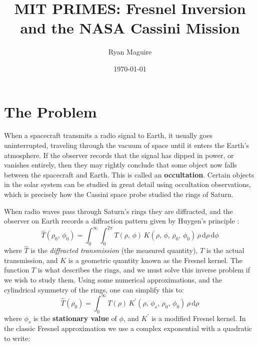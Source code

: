 \documentclass{article}
\title{MIT PRIMES: Fresnel Inversion and the NASA Cassini Mission}
\author{Ryan Maguire}
\date{\today}
\begin{document}
    \maketitle
    \section{The Problem}
        When a spacecraft transmits a radio signal to Earth, it usually goes
        uninterrupted, traveling through the vacuum of space until it enters
        the Earth's atmosphere. If the observer records that the signal has
        dipped in power, or vanishes entirely, then they may rightly conclude
        that some object now falls between the spacecraft and Earth. This is
        called an \textbf{occultation}. Certain objects in the solar system
        can be studied in great detail using occultation observations, which is
        precisely how the Cassini space probe studied the rings of Saturn.
        \par\hfill\par
        When radio waves pass through Saturn's rings they are diffracted, and
        the observer on Earth records a diffraction pattern given by
        Huygen's principle \cite{Goodman1969IntroductionTF}:
        \begin{equation}
            \hat{T}(\rho_{0},\,\phi_{0})
            =\int_{0}^{\infty}\int_{0}^{2\pi}
                T(\rho,\,\phi)\,
                K(\rho,\,\phi,\,\rho_{0},\,\phi_{0})\,
                \rho\,\textrm{d}\rho\,\textrm{d}\phi
        \end{equation}
        where $\hat{T}$ is the \textit{diffracted transmission} (the measured
        quantity), $T$ is the actual transmission, and $K$ is a geometric
        quantity known as the Fresnel kernel. The function $T$ is what
        describes the rings, and we must solve this inverse problem if we
        wish to study them. Using some numerical approximations, and the
        cylindrical symmetry of the rings, one can simplify this to:
        \begin{equation}
            \hat{T}(\rho_{0})
            =\int_{0}^{\infty}T(\rho)\,
                K^{\prime}(\rho,\,\phi_{s},\,\rho_{0},\,\phi_{0})\,
                \rho\,\textrm{d}\rho
        \end{equation}
        where $\phi_{s}$ is the \textbf{stationary value} of $\phi$, and
        $K^{\prime}$ is a modified Fresnel kernel. In the classic Fresnel
        approximation we use a complex exponential with a quadratic to write:
\end{document}
